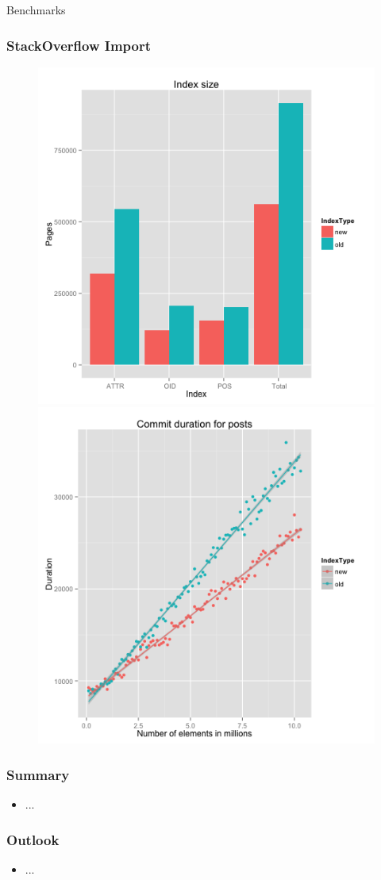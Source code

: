 \documentclass{beamer}
\begin{document}
\begin{section}{Benchmarks}
    \begin{frame}
      \frametitle{StackOverflow Import}
        \begin{figure}
          \includegraphics[scale=0.3]{images/SO_sizes.png}
          \quad
          \pause
          \includegraphics[scale=0.3]{images/SO_commit_duration.png}
        \end{figure}
    \end{frame}
  \end{section}

  \begin{frame}
    \frametitle{Summary}
      \begin{itemize}
        \item ...
      \end{itemize}
  \end{frame}

  \begin{frame}
    \frametitle{Outlook}
      \begin{itemize}
        \item ...
      \end{itemize}
  \end{frame}
\end{document}
